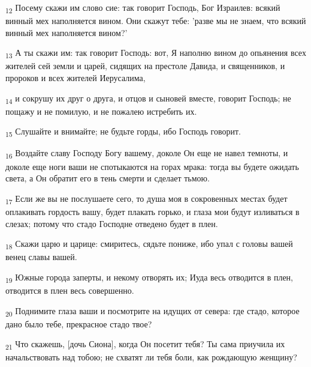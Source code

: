 \begin{tcolorbox}
\textsubscript{12} Посему скажи им слово сие: так говорит Господь, Бог Израилев: всякий винный мех наполняется вином. Они скажут тебе: 'разве мы не знаем, что всякий винный мех наполняется вином?'
\end{tcolorbox}
\begin{tcolorbox}
\textsubscript{13} А ты скажи им: так говорит Господь: вот, Я наполню вином до опьянения всех жителей сей земли и царей, сидящих на престоле Давида, и священников, и пророков и всех жителей Иерусалима,
\end{tcolorbox}
\begin{tcolorbox}
\textsubscript{14} и сокрушу их друг о друга, и отцов и сыновей вместе, говорит Господь; не пощажу и не помилую, и не пожалею истребить их.
\end{tcolorbox}
\begin{tcolorbox}
\textsubscript{15} Слушайте и внимайте; не будьте горды, ибо Господь говорит.
\end{tcolorbox}
\begin{tcolorbox}
\textsubscript{16} Воздайте славу Господу Богу вашему, доколе Он еще не навел темноты, и доколе еще ноги ваши не спотыкаются на горах мрака: тогда вы будете ожидать света, а Он обратит его в тень смерти и сделает тьмою.
\end{tcolorbox}
\begin{tcolorbox}
\textsubscript{17} Если же вы не послушаете сего, то душа моя в сокровенных местах будет оплакивать гордость вашу, будет плакать горько, и глаза мои будут изливаться в слезах; потому что стадо Господне отведено будет в плен.
\end{tcolorbox}
\begin{tcolorbox}
\textsubscript{18} Скажи царю и царице: смиритесь, сядьте пониже, ибо упал с головы вашей венец славы вашей.
\end{tcolorbox}
\begin{tcolorbox}
\textsubscript{19} Южные города заперты, и некому отворять их; Иуда весь отводится в плен, отводится в плен весь совершенно.
\end{tcolorbox}
\begin{tcolorbox}
\textsubscript{20} Поднимите глаза ваши и посмотрите на идущих от севера: где стадо, которое дано было тебе, прекрасное стадо твое?
\end{tcolorbox}
\begin{tcolorbox}
\textsubscript{21} Что скажешь, [дочь Сиона], когда Он посетит тебя? Ты сама приучила их начальствовать над тобою; не схватят ли тебя боли, как рождающую женщину?
\end{tcolorbox}
